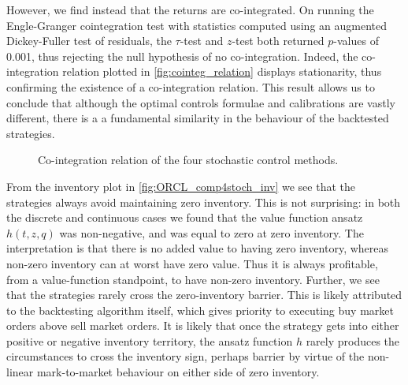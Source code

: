 However, we find instead that the returns are co-integrated. On running the Engle-Granger cointegration test with statistics computed using an augmented Dickey-Fuller test of residuals, the $\tau$-test and $z$-test both returned $p$-values of 0.001, thus rejecting the null hypothesis of no co-integration. Indeed, the co-integration relation plotted in \autoref{fig:cointeg_relation} displays stationarity, thus confirming the existence of a co-integration relation. This result allows us to conclude that although the optimal controls formulae and calibrations are vastly different, there is a a fundamental similarity in the behaviour of the backtested strategies.

\begin{figure}[H]
  \centering
  \setlength{} 
  \setlength{}
  
  \caption{Co-integration relation of the four stochastic control methods.}
  \label{fig:cointeg_relation}
\end{figure}
From the inventory plot in \autoref{fig:ORCL_comp4stoch_inv} we see that the strategies always avoid maintaining zero inventory. This is not surprising: in both the discrete and continuous cases we found that the value function ansatz $h(t,z,q)$ was non-negative, and was equal to zero at zero inventory. The interpretation is that there is no added value to having zero inventory, whereas non-zero inventory can at worst have zero value. Thus it is always profitable, from a value-function standpoint, to have non-zero inventory. Further, we see that the strategies rarely cross the zero-inventory barrier. This is likely attributed to the backtesting algorithm itself, which gives priority to executing buy market orders above sell market orders. It is likely that once the strategy gets into either positive or negative inventory territory, the ansatz function $h$ rarely produces the circumstances to cross the inventory sign, perhaps barrier by virtue of the non-linear mark-to-market behaviour on either side of zero inventory.

